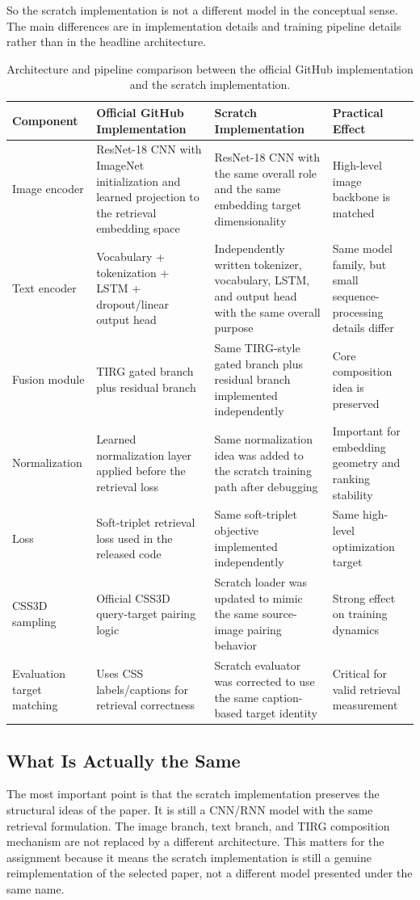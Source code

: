 \documentclass[11pt]{article}
\begin{document}
So the scratch implementation is not a different model in the conceptual sense. The main differences are in implementation details and training pipeline details rather than in the headline architecture.

\begin{table}[h]
\centering
\begin{tabular}{p{2.6cm}p{4.1cm}p{4.1cm}p{3.1cm}}
\toprule
Component & Official GitHub Implementation & Scratch Implementation & Practical Effect \\
\midrule
Image encoder & ResNet-18 CNN with ImageNet initialization and learned projection to the retrieval embedding space & ResNet-18 CNN with the same overall role and the same embedding target dimensionality & High-level image backbone is matched \\
Text encoder & Vocabulary + tokenization + LSTM + dropout/linear output head & Independently written tokenizer, vocabulary, LSTM, and output head with the same overall purpose & Same model family, but small sequence-processing details differ \\
Fusion module & TIRG gated branch plus residual branch & Same TIRG-style gated branch plus residual branch implemented independently & Core composition idea is preserved \\
Normalization & Learned normalization layer applied before the retrieval loss & Same normalization idea was added to the scratch training path after debugging & Important for embedding geometry and ranking stability \\
Loss & Soft-triplet retrieval loss used in the released code & Same soft-triplet objective implemented independently & Same high-level optimization target \\
CSS3D sampling & Official CSS3D query-target pairing logic & Scratch loader was updated to mimic the same source-image pairing behavior & Strong effect on training dynamics \\
Evaluation target matching & Uses CSS labels/captions for retrieval correctness & Scratch evaluator was corrected to use the same caption-based target identity & Critical for valid retrieval measurement \\
\bottomrule
\end{tabular}
\caption{Architecture and pipeline comparison between the official GitHub implementation and the scratch implementation.}
\label{tab:archcompare}
\end{table}

\subsection{What Is Actually the Same}
The most important point is that the scratch implementation preserves the structural ideas of the paper. It is still a CNN/RNN model with the same retrieval formulation. The image branch, text branch, and TIRG composition mechanism are not replaced by a different architecture. This matters for the assignment because it means the scratch implementation is still a genuine reimplementation of the selected paper, not a different model presented under the same name.
\end{document}
